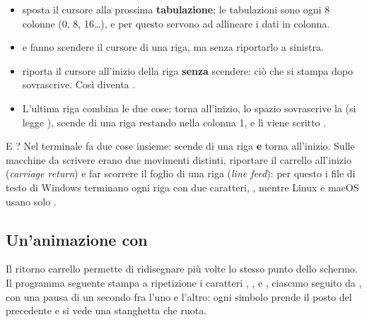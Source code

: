 \begin{itemize}
  \item {} sposta il cursore alla prossima
        \textbf{tabulazione}; le tabulazioni sono ogni 8 colonne (0, 8,
        16\dots), e per questo servono ad allineare i dati in colonna.
  \item {} e  fanno scendere il
        cursore di una riga, ma senza riportarlo a sinistra.
  \item {} riporta il cursore all'inizio della riga
        \textbf{senza} scendere: ciò che si stampa dopo sovrascrive. Così
         diventa .
  \item L'ultima riga combina le due cose:  torna
        all'inizio, lo spazio sovrascrive la  (si legge ),
         scende di una riga restando nella colonna 1,
        e lì viene scritto .
\end{itemize}

E ? Nel terminale fa due cose insieme: scende di una
riga \textbf{e} torna all'inizio. Sulle macchine da scrivere erano due
movimenti distinti, riportare il carrello all'inizio (\textit{carriage
return}) e far scorrere il foglio di una riga (\textit{line feed}): per
questo i file di testo di Windows terminano ogni riga con due caratteri,
, mentre Linux e macOS usano solo
.

\subsection{Un'animazione con }

Il ritorno carrello permette di ridisegnare più volte lo stesso punto dello
schermo. Il programma seguente stampa a ripetizione i caratteri
\code{|}, \code{/}, \code{-} e \code{\textbackslash}, ciascuno seguito da
, con una pausa di un secondo fra l'uno e l'altro:
ogni simbolo prende il posto del precedente e si vede una stanghetta che
ruota.


